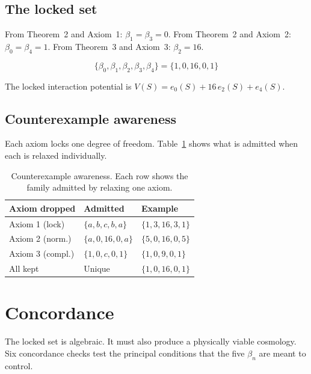 \documentclass[twocolumn,showpacs,preprintnumbers,amsmath,amssymb,prd]{revtex4-2}
\begin{document}
\subsection{The locked set}

From Theorem~2 and Axiom~1: $\beta_1 = \beta_3 = 0$.
From Theorem~2 and Axiom~2: $\beta_0 = \beta_4 = 1$.
From Theorem~3 and Axiom~3: $\beta_2 = 16$.

\begin{equation}
\label{eq:lock}
\boxed{\{\beta_0, \beta_1, \beta_2, \beta_3, \beta_4\} = \{1, 0, 16, 0, 1\}}
\end{equation}

The locked interaction potential is $V(S) = e_0(S) + 16\,e_2(S) + e_4(S)$.

\subsection{Counterexample awareness}

Each axiom locks one degree of freedom. Table~\ref{tab:counter} shows what is admitted when each is relaxed individually.

\begin{table}[h]
\centering
\begin{tabular}{lll}
\toprule
\textbf{Axiom dropped} & \textbf{Admitted} & \textbf{Example} \\
\midrule
Axiom 1 (lock) & $\{a, b, c, b, a\}$ & $\{1, 3, 16, 3, 1\}$ \\
Axiom 2 (norm.) & $\{a, 0, 16, 0, a\}$ & $\{5, 0, 16, 0, 5\}$ \\
Axiom 3 (compl.) & $\{1, 0, c, 0, 1\}$ & $\{1, 0, 9, 0, 1\}$ \\
All kept & Unique & $\{1, 0, 16, 0, 1\}$ \\
\bottomrule
\end{tabular}
\caption{Counterexample awareness. Each row shows the family admitted by relaxing one axiom.}
\label{tab:counter}
\end{table}


\section{Concordance}
\label{sec:concordance}

The locked set is algebraic. It must also produce a physically viable cosmology. Six concordance checks test the principal conditions that the five $\beta_n$ are meant to control.
\end{document}
